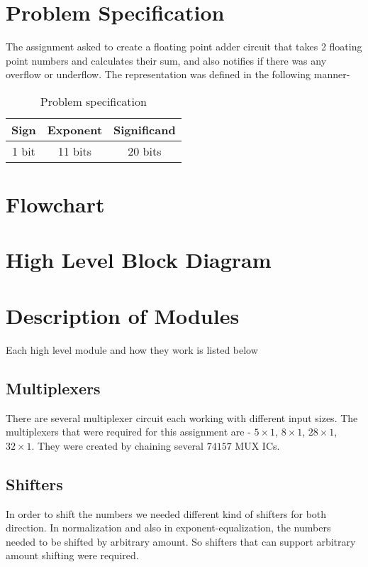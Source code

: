 \documentclass[14pt]{article}
\begin{document}
\pagebreak

\section{Problem Specification}
The assignment asked to create a floating point adder circuit that takes 2 floating point numbers and calculates their sum, and also notifies if there was any overflow or underflow. The representation was defined in the following manner- \\

\begin{table}[!h]
	\begin{center}
		\begin{tabular}{|c|c|c|}
			\hline
			\textbf{Sign} & \textbf{Exponent} & \textbf{Significand}\\
			\hline
			1 bit & 11 bits & 20 bits\\
			\hline
		\end{tabular}
		\caption{Problem specification}
	\end{center}
\end{table}

\section{Flowchart}
\pagebreak
\section{High Level Block Diagram}
\pagebreak
\section{Description of Modules}
Each high level module and how they work is listed below

\subsection{Multiplexers}
There are several multiplexer circuit each working with different input sizes. The multiplexers that were required for this assignment are - $5\times1$, $8\times1$, $28\times1$, $32\times1$. They were created by chaining several $74157$ MUX ICs.

\subsection{Shifters}\label{shifter_section}
In order to shift the numbers we needed different kind of shifters for both direction. In normalization and also in exponent-equalization, the numbers needed to be shifted by arbitrary amount. So shifters that can support arbitrary amount shifting were required.\\
\end{document}
